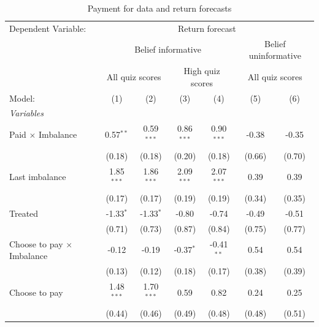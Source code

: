 \begin{table}[htbp]
   \caption{Payment for data and return forecasts}
   \centering
   \begin{tabular}{lcccccc}
      \tabularnewline \midrule \midrule
      Dependent Variable: & \multicolumn{6}{c}{Return forecast}\\
       & \multicolumn{4}{c}{Belief informative} & \multicolumn{2}{c}{Belief uninformative} \\ 
       & \multicolumn{2}{c}{All quiz scores} & \multicolumn{2}{c}{High quiz scores} & \multicolumn{2}{c}{All quiz scores} \\ 
      Model:                            & (1)           & (2)           & (3)           & (4)           & (5)           & (6)\\  
      \midrule
      \emph{Variables}\\
      Paid $\times$ Imbalance           & 0.57$^{**}$   & 0.59$^{***}$  & 0.86$^{***}$  & 0.90$^{***}$  & -0.38         & -0.35\\   
                                        & (0.18)        & (0.18)        & (0.20)        & (0.18)        & (0.66)        & (0.70)\\   
      Last imbalance                    & 1.85$^{***}$  & 1.86$^{***}$  & 2.09$^{***}$  & 2.07$^{***}$  & 0.39          & 0.39\\   
                                        & (0.17)        & (0.17)        & (0.19)        & (0.19)        & (0.34)        & (0.35)\\   
      Treated                           & -1.33$^{*}$   & -1.33$^{*}$   & -0.80         & -0.74         & -0.49         & -0.51\\   
                                        & (0.71)        & (0.73)        & (0.87)        & (0.84)        & (0.75)        & (0.77)\\   
      Choose to pay $\times$ Imbalance  & -0.12         & -0.19         & -0.37$^{*}$   & -0.41$^{**}$  & 0.54          & 0.54\\   
                                        & (0.13)        & (0.12)        & (0.18)        & (0.17)        & (0.38)        & (0.39)\\   
      Choose to pay                     & 1.48$^{***}$  & 1.70$^{***}$  & 0.59          & 0.82          & 0.24          & 0.25\\   
                                        & (0.44)        & (0.46)        & (0.49)        & (0.48)        & (0.48)        & (0.51)\\   

\end{tabular}
\end{table}
